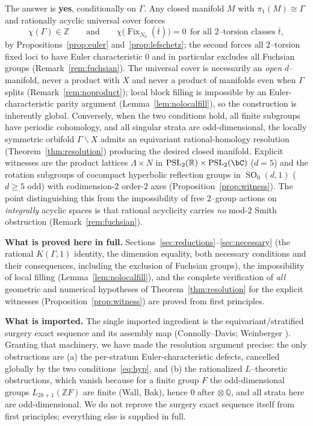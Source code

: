 \documentclass[12pt]{article}
\newcommand{\bR}{\mathbb{R}}
\newcommand{\bQ}{\mathbb{Q}}
\newcommand{\bZ}{\mathbb{Z}}
\newcommand{\Fix}{\operatorname{Fix}}
\DeclareMathOperator{\SO}{SO}
\DeclareMathOperator{\PSL}{PSL}
\theoremstyle{definition}
\begin{document}
The answer is \textbf{yes}, conditionally on $\Gamma$.  Any closed manifold $M$
with $\pi_1(M)\cong\Gamma$ and rationally acyclic universal cover forces
\[
   \chi(\Gamma)\in\bZ
   \qquad\text{and}\qquad
   \chi\bigl(\Fix_{N_0}(\bar t)\bigr)=0\ \ \text{for all
   $2$--torsion classes }\bar t,
\]
by Propositions~\ref{prop:euler} and~\ref{prop:lefschetz}; the second forces all
$2$--torsion fixed loci to have Euler characteristic $0$ and in particular
excludes all Fuchsian groups (Remark~\ref{rem:fuchsian}).  The universal cover is
necessarily an \emph{open} $d$--manifold, never a product with $X$ and never a
product of manifolds even when $\Gamma$ splits (Remark~\ref{rem:noproduct});
local block filling is impossible by an Euler-characteristic parity argument
(Lemma~\ref{lem:nolocalfill}), so the construction is inherently global.
Conversely, when the two conditions hold, all finite subgroups have periodic
cohomology, and all singular strata are odd-dimensional, the locally symmetric
orbifold $\Gamma\backslash X$ admits an equivariant rational-homology resolution
(Theorem~\ref{thm:resolution}) producing the desired closed manifold.  Explicit
witnesses are the product lattices $\Lambda\times N$ in
$\PSL_2(\bR)\times\PSL_2(\bC)$ ($d=5$) and the rotation subgroups of cocompact
hyperbolic reflection groups in $\SO_0(d,1)$ ($d\ge5$ odd) with codimension-$2$
order-$2$ axes (Proposition~\ref{prop:witness}).  The point distinguishing this
from the impossibility of free $2$--group actions on \emph{integrally} acyclic
spaces is that rational acyclicity carries \emph{no} mod-$2$ Smith obstruction
(Remark~\ref{rem:fuchsian}).

\medskip
\noindent\textbf{What is proved here in full.}
Sections~\ref{sec:reductions}--\ref{sec:necessary} (the rational $K(\Gamma,1)$
identity, the dimension equality, both necessary conditions and their
consequences, including the exclusion of Fuchsian groups), the impossibility of
local filling (Lemma~\ref{lem:nolocalfill}), and the complete verification of
\emph{all} geometric and numerical hypotheses of Theorem~\ref{thm:resolution} for
the explicit witnesses (Proposition~\ref{prop:witness}) are proved from first
principles.

\medskip
\noindent\textbf{What is imported.}
The single imported ingredient is the equivariant/stratified surgery exact
sequence and its assembly map (Connolly--Davis; Weinberger
\cite[Chs.~II, V]{Weinberger}).  Granting that machinery, we have made the
resolution argument precise: the only obstructions are (a) the per-stratum
Euler-characteristic defects, cancelled globally by the two
conditions~\eqref{eq:hyp}, and (b) the rationalized $L$--theoretic obstructions,
which vanish because for a finite group $F$ the odd-dimensional groups
$L_{2k+1}(\bZ F)$ are finite (Wall, Bak), hence $0$ after $\otimes\,\bQ$, and all
strata here are odd-dimensional.  We do not reprove the surgery exact sequence
itself from first principles; everything else is supplied in full.
\end{document}

